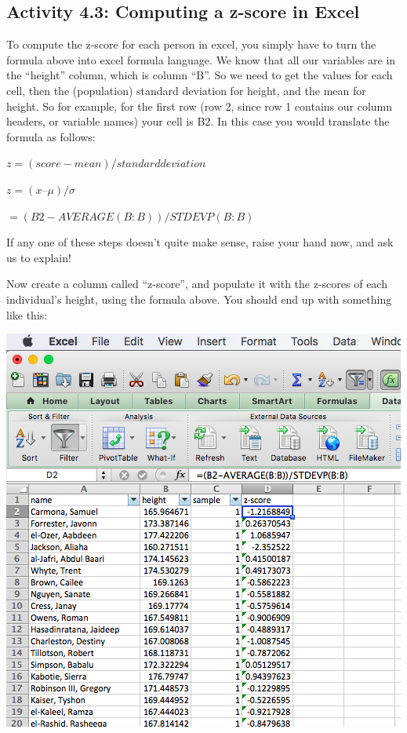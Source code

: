 \documentclass[
]{book}
\begin{document}
\hypertarget{activity-4.3-computing-a-z-score-in-excel}{%
\subsection{Activity 4.3: Computing a z-score in Excel}\label{activity-4.3-computing-a-z-score-in-excel}}

To compute the z-score for each person in excel, you simply have to turn the formula above into excel formula language. We know that all our variables are in the ``height'' column, which is column ``B''. So we need to get the values for each cell, then the (population) standard deviation for height, and the mean for height. So for example, for the first row (row 2, since row 1 contains our column headers, or variable names) your cell is B2. In this case you would translate the formula as follows:

\(z = (score - mean) / standard deviation\)

\(z = (x – μ) / σ\)

\(=(B2-AVERAGE(B:B))/STDEVP(B:B)\)

If any one of these steps doesn't quite make sense, raise your hand now, and ask us to explain!

Now create a column called ``z-score'', and populate it with the z-scores of each individual's height, using the formula above. You should end up with something like this:

\includegraphics{imgs/z-score-col.png}
\end{document}
